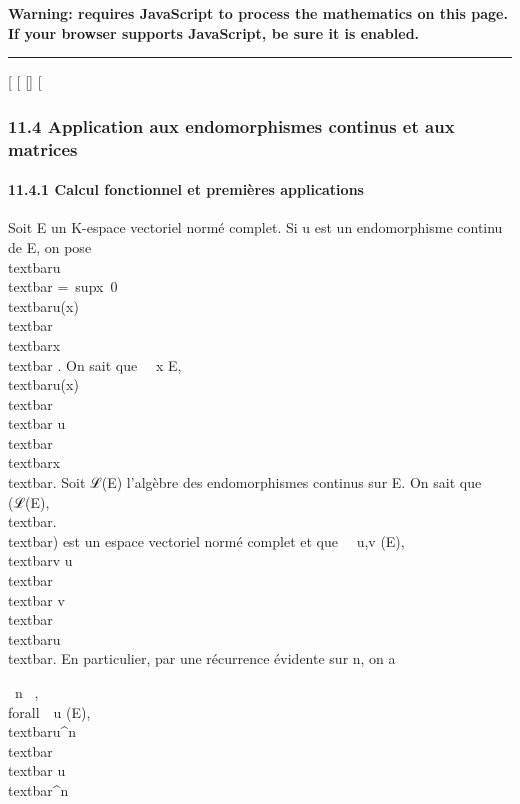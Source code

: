 \textbf{Warning: 
requires JavaScript to process the mathematics on this page.\\ If your
browser supports JavaScript, be sure it is enabled.}

\begin{center}\rule{3in}{0.4pt}\end{center}

{[}
{[}
{[}{]}
{[}

\subsubsection{11.4 Application aux endomorphismes continus et aux
matrices}

\paragraph{11.4.1 Calcul fonctionnel et premières applications}

Soit E un K-espace vectoriel normé complet. Si u est un endomorphisme
continu de E, on pose
\\textbar{}u\\textbar{}
=\
supx\neq~0
\\textbar{}u(x)\\textbar{}
\over
\\textbar{}x\\textbar{} . On sait que
\forall~~x \in E,
\\textbar{}u(x)\\textbar{}
\leq\\textbar{}
u\\textbar{}\,\\textbar{}x\\textbar{}.
Soit ℒ(E) l'algèbre des endomorphismes continus sur E. On sait que
(ℒ(E),\\textbar{}.\\textbar{}) est un
espace vectoriel normé complet et que \forall~~u,v
(E), \\textbar{}v \cdot u\\textbar{}
\leq\\textbar{}
v\\textbar{}\,\\textbar{}u\\textbar{}.
En particulier, par une récurrence évidente sur n, on a

\forall~n \in {}~, \\forall~~u (E),
\\textbar{}u^n\\textbar{}
\leq\\textbar{} u\\textbar{}^n

